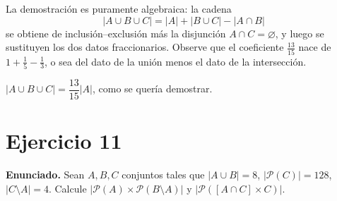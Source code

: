 \documentclass[11pt]{article}
\begin{document}
\begin{nota}
La demostración es puramente algebraica: la cadena
\[
|A\cup B\cup C| = |A| + |B\cup C| - |A\cap B|
\]
se obtiene de inclusión--exclusión más la disjunción $A\cap C=\varnothing$, y luego se sustituyen los dos datos fraccionarios. Observe que el coeficiente $\tfrac{13}{15}$ nace de $1+\tfrac15-\tfrac13$, o sea del dato de la unión menos el dato de la intersección.
\end{nota}

\begin{resp}
$|A\cup B\cup C| = \dfrac{13}{15}|A|$, como se quería demostrar.
\end{resp}

\section*{Ejercicio 11}

\textbf{Enunciado.} Sean $A, B, C$ conjuntos tales que $|A\cup B| = 8$, $|\mathcal{P}(C)| = 128$, $|C\setminus A| = 4$. Calcule $|\mathcal{P}(A)\times \mathcal{P}(B\setminus A)|$ y $|\mathcal{P}([A\cap C]\times C)|$.
\end{document}
